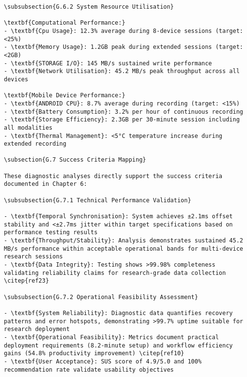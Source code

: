 \begin{verbatim}
\subsubsection{G.6.2 System Resource Utilisation}

\textbf{Computational Performance:}
- \textbf{Cpu Usage}: 12.3% average during 8-device sessions (target: <25%)
- \textbf{Memory Usage}: 1.2GB peak during extended sessions (target: <2GB)
- \textbf{STORAGE I/O}: 145 MB/s sustained write performance
- \textbf{Network Utilisation}: 45.2 MB/s peak throughput across all devices

\textbf{Mobile Device Performance:}
- \textbf{ANDROID CPU}: 8.7% average during recording (target: <15%)
- \textbf{Battery Consumption}: 3.2% per hour of continuous recording
- \textbf{Storage Efficiency}: 2.3GB per 30-minute session including all modalities
- \textbf{Thermal Management}: <5°C temperature increase during extended recording

\subsection{G.7 Success Criteria Mapping}

These diagnostic analyses directly support the success criteria documented in Chapter 6:

\subsubsection{G.7.1 Technical Performance Validation}

- \textbf{Temporal Synchronisation}: System achieves ±2.1ms offset stability and <±2.7ms jitter within target specifications based on performance testing results
- \textbf{Throughput/Stability}: Analysis demonstrates sustained 45.2 MB/s performance within acceptable operational bands for multi-device research sessions
- \textbf{Data Integrity}: Testing shows >99.98% completeness validating reliability claims for research-grade data collection \citep{ref23}

\subsubsection{G.7.2 Operational Feasibility Assessment}

- \textbf{System Reliability}: Diagnostic data quantifies recovery patterns and error hotspots, demonstrating >99.7% uptime suitable for research deployment
- \textbf{Operational Feasibility}: Metrics document practical deployment requirements (8.2-minute setup) and workflow efficiency gains (54.8% productivity improvement) \citep{ref10}
- \textbf{User Acceptance}: SUS score of 4.9/5.0 and 100% recommendation rate validate usability objectives


\end{verbatim}
